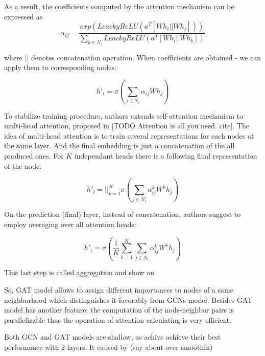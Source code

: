 As a result, the coefficients computed by the attention mechanism can be expressed as
\begin{equation}
    \alpha_{ij} = \frac{exp(LeackyReLU(a^{T}[Wh_i || Wh_j]))}{\sum_{k \in N_i}LeackyReLU(a^{T}[Wh_i || Wh_k])}
    \label{eq:final_att_coef}
 \end{equation}

where $||$ denotes concatenation operation. When coefficients are obtained - we can apply them to corresponding nodes:

\begin{equation}
    h'_i = \sigma \left( \sum_{j \in {N_i}} \alpha_{ij} W h_j \right)
    \label{eq:final_att}
 \end{equation}

To stabilize training procedure, authors extends self-attention mechanism
to multi-head attention, proposed in [TODO Attention is all you need. cite].
The idea of multi-head attention is to train several representations for each nodes at the same layer. And the final embedding
is just a concatenation of the all produced ones. For $K$ independant heads  there is a following final representation of the node:


\begin{equation}
    h'_i = ||_{k=1}^{K}  \sigma \left( \sum_{j \in {N_i}} \alpha^{k}_{ij} W^{k} h_j \right)
    \label{eq:multihead}
\end{equation}

On the prediction (final) layer, instead of concatenation, authors suggest to employ averaging over all attention heads:

\begin{equation}
    h'_i =  \sigma \left( \frac{1}{K} \sum_{k=1}^{K} \sum_{j \in {N_i}} \alpha^{k}_{ij} W^{k} h_j \right)
    \label{eq:multihead2}
\end{equation}

This last step is called aggregation and show on %

So, GAT model allows to assign different importances to nodes of a same neighborhood which distinguishes it favorably from GCNs
model. Besides GAT model has another feature: the computation of the node-neighbor pairs is parallelizable thus the operation
of attention calculating is very efficient.


Both GCN\cite{GCN} and GAT\cite{GAT} models are shallow, as achive achieve their best performance with 2-layers. It caused by (say about over smoothin)

